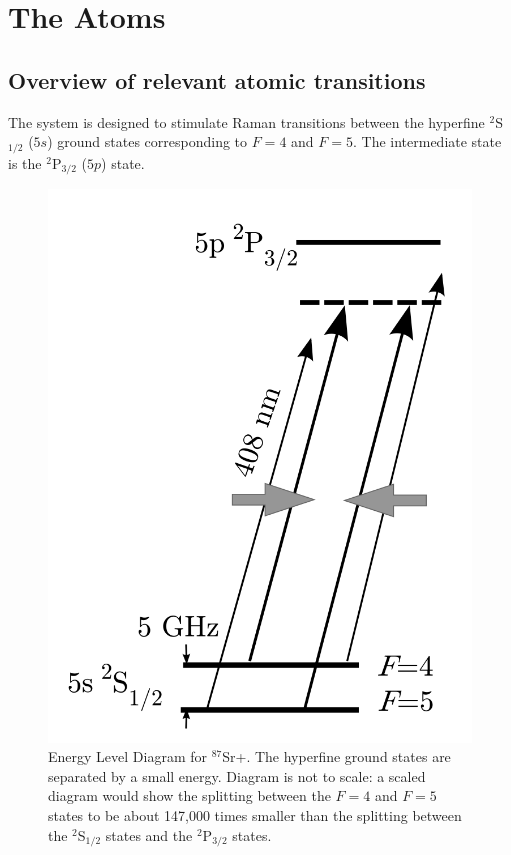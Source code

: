 \chapter{The Atoms} \label{ChapterAboutTheAtoms}
\section{Overview of relevant atomic transitions}

The system is designed to stimulate Raman transitions between the hyperfine $^2$S$_{1/2}$ ($5s$) ground states corresponding to $F=4$ and $F=5$. The intermediate state is the $^2$P$_{3/2}$ ($5p$) state. 

\begin{figure}
\centerline{
\includegraphics[totalheight=0.3\textheight]{E_level_from_proposal}
}
\caption[Energy Level Diagram for $^{87}$Sr+]{Energy Level Diagram for $^{87}$Sr+. The hyperfine ground states are separated by a small energy. Diagram is not to scale: a scaled diagram would show the splitting between the $F=4$ and $F=5$ states to be about 147,000 times smaller than the splitting between the $^2$S$_{1/2}$ states and the $^2$P$_{3/2}$ states.}
\end{figure}

